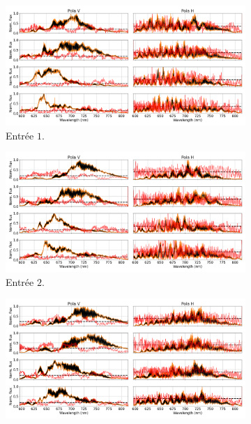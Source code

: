 \begin{figure}[ht!]
    \centering
    \begin{subfigure}{0.5\textwidth}
        \centering
        \includegraphics[width=\textwidth]{Figure_Chap4/20220811_P2VM_01_Flat1_1_WigglesContrast.png}
        \caption{Entrée $1$.}
    \end{subfigure}%
    \begin{subfigure}{0.5\textwidth}
        \centering
        \includegraphics[width=\textwidth]{Figure_Chap4/20220811_P2VM_01_Flat1_2_WigglesContrast.png}
        \caption{Entrée $2$.}
    \end{subfigure}
    \begin{subfigure}{0.5\textwidth}
        \centering
        \includegraphics[width=\textwidth]{Figure_Chap4/20220811_P2VM_01_Flat1_3_WigglesContrast.png}

\end{subfigure}
\end{figure}
